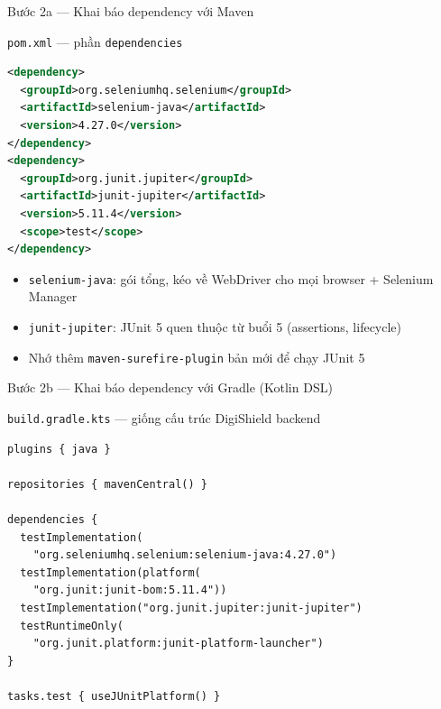 \documentclass[aspectratio=169,12pt]{beamer}
\begin{document}
\begin{frame}[fragile]{Bước 2a --- Khai báo dependency với Maven}
  \begin{exampleblock}{\texttt{pom.xml} --- phần \texttt{dependencies}}
\begin{lstlisting}[language=xml,basicstyle=\ttfamily\scriptsize]
<dependency>
  <groupId>org.seleniumhq.selenium</groupId>
  <artifactId>selenium-java</artifactId>
  <version>4.27.0</version>
</dependency>
<dependency>
  <groupId>org.junit.jupiter</groupId>
  <artifactId>junit-jupiter</artifactId>
  <version>5.11.4</version>
  <scope>test</scope>
</dependency>
\end{lstlisting}
  \end{exampleblock}

  \begin{itemize}
    \item \texttt{selenium-java}: gói tổng, kéo về WebDriver cho mọi browser + Selenium Manager
    \item \texttt{junit-jupiter}: JUnit 5 quen thuộc từ buổi 5 (assertions, lifecycle)
    \item Nhớ thêm \texttt{maven-surefire-plugin} bản mới để chạy JUnit 5
  \end{itemize}
\end{frame}

\begin{frame}[fragile]{Bước 2b --- Khai báo dependency với Gradle (Kotlin DSL)}
  \begin{exampleblock}{\texttt{build.gradle.kts} --- giống cấu trúc DigiShield backend}
\begin{lstlisting}[language={},basicstyle=\ttfamily\scriptsize]
plugins { java }

repositories { mavenCentral() }

dependencies {
  testImplementation(
    "org.seleniumhq.selenium:selenium-java:4.27.0")
  testImplementation(platform(
    "org.junit:junit-bom:5.11.4"))
  testImplementation("org.junit.jupiter:junit-jupiter")
  testRuntimeOnly(
    "org.junit.platform:junit-platform-launcher")
}

tasks.test { useJUnitPlatform() }
\end{lstlisting}
  \end{exampleblock}
\end{frame}
\end{document}
